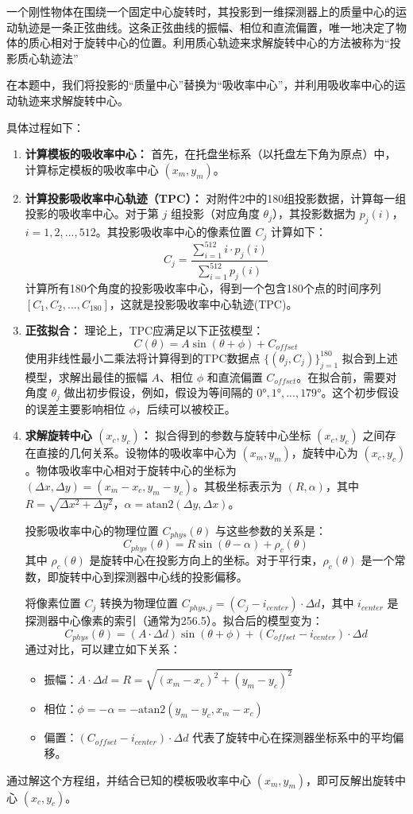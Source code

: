 一个刚性物体在围绕一个固定中心旋转时，其投影到一维探测器上的质量中心的运动轨迹是一条正弦曲线。这条正弦曲线的振幅、相位和直流偏置，唯一地决定了物体的质心相对于旋转中心的位置。利用质心轨迹来求解旋转中心的方法被称为“投影质心轨迹法”\par
在本题中，我们将投影的“质量中心”替换为“吸收率中心”，并利用吸收率中心的运动轨迹来求解旋转中心。\par
具体过程如下：
\begin{enumerate}
    \item \textbf{计算模板的吸收率中心：} 首先，在托盘坐标系（以托盘左下角为原点）中，计算标定模板的吸收率中心 $(x_m,y_m)$。
    \item \textbf{计算投影吸收率中心轨迹（TPC）：} 对附件2中的180组投影数据，计算每一组投影的吸收率中心。对于第 $j$ 组投影（对应角度 $\theta_j$），其投影数据为 $p_j(i)$，$i=1,2,...,512$。其投影吸收率中心的像素位置 $C_j$ 计算如下：
       $$C_j=\frac{\sum_{i=1}^{512}i\cdot p_j(i)}{\sum_{i=1}^{512}p_j(i)}$$
       计算所有180个角度的投影吸收率中心，得到一个包含180个点的时间序列 $[C_1,C_2,...,C_{180}]$，这就是投影吸收率中心轨迹(TPC)。
    \item \textbf{正弦拟合：} 理论上，TPC应满足以下正弦模型：
       $$C(\theta)=A\sin(\theta+\phi)+C_{offset}$$
       使用非线性最小二乘法将计算得到的TPC数据点 $\{(\theta_j,C_j)\}_{j=1}^{180}$ 拟合到上述模型，求解出最佳的振幅 $A$、相位 $\phi$ 和直流偏置 $C_{offset}$。在拟合前，需要对角度 $\theta_j$ 做出初步假设，例如，假设为等间隔的 $0°,1°,...,179°$。这个初步假设的误差主要影响相位 $\phi$，后续可以被校正。
    \item \textbf{求解旋转中心 $(x_c,y_c)$：} 拟合得到的参数与旋转中心坐标 $(x_c,y_c)$ 之间存在直接的几何关系。设物体的吸收率中心为 $(x_m,y_m)$，旋转中心为 $(x_c,y_c)$。物体吸收率中心相对于旋转中心的坐标为 $(\Delta x,\Delta y)=(x_m-x_c,y_m-y_c)$。其极坐标表示为 $(R,\alpha)$，其中 $R=\sqrt{\Delta x^2+\Delta y^2}$，$\alpha=\text{atan2}(\Delta y,\Delta x)$。
       
       投影吸收率中心的物理位置 $C_{phys}(\theta)$ 与这些参数的关系是：
       $$C_{phys}(\theta)=R\sin(\theta-\alpha)+\rho_c(\theta)$$
       其中 $\rho_c(\theta)$ 是旋转中心在投影方向上的坐标。对于平行束，$\rho_c(\theta)$ 是一个常数，即旋转中心到探测器中心线的投影偏移。
       
       将像素位置 $C_j$ 转换为物理位置 $C_{phys,j}=(C_j-i_{center})\cdot\Delta d$，其中 $i_{center}$ 是探测器中心像素的索引（通常为256.5）。拟合后的模型变为：
       $$C_{phys}(\theta)=(A\cdot\Delta d)\sin(\theta+\phi)+(C_{offset}-i_{center})\cdot\Delta d$$
       通过对比，可以建立如下关系：
       \begin{itemize}
           \item 振幅：$A\cdot\Delta d=R=\sqrt{(x_m-x_c)^2+(y_m-y_c)^2}$
           \item 相位：$\phi=-\alpha=-\text{atan2}(y_m-y_c,x_m-x_c)$
           \item 偏置：$(C_{offset}-i_{center})\cdot\Delta d$ 代表了旋转中心在探测器坐标系中的平均偏移。
       \end{itemize}
\end{enumerate}

通过解这个方程组，并结合已知的模板吸收率中心 $(x_m,y_m)$，即可反解出旋转中心 $(x_c,y_c)$。








